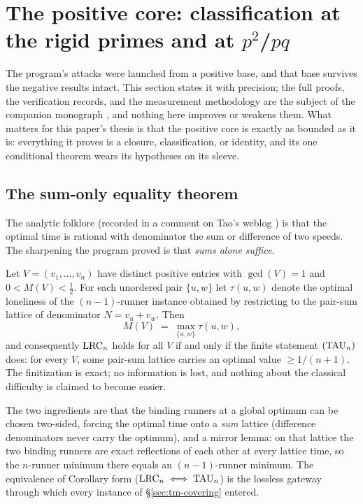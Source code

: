 
\section{The positive core: classification at the rigid primes and at
\boldmath$p^2$/$pq$}\label{sec:positive}

The program's attacks were launched from a positive base, and that base
survives the negative results intact. This section states it with
precision; the full proofs, the verification records, and the
measurement methodology are the subject of the companion monograph
\cite{prog-artifacts}, and nothing here improves or weakens them. What
matters for this paper's thesis is that the positive core is exactly as
bounded as it is: everything it proves is a closure, classification, or
identity, and its one conditional theorem wears its hypotheses on its
sleeve.

\subsection{The sum-only equality theorem}

The analytic folklore (recorded in a comment on Tao's weblog
\cite{Tao-blog}) is that the optimal time is rational with denominator
the sum or difference of two speeds. The sharpening the program proved
is that \emph{sums alone suffice}.

\begin{theorem}\label{thm:equality}
Let $V=(v_1,\dots,v_n)$ have distinct positive entries with
$\gcd(V)=1$ and $0<M(V)<\tfrac12$. For each unordered pair $\{u,w\}$
let $\tau(u,w)$ denote the optimal loneliness of the
$(n-1)$-runner instance obtained by restricting to the pair-sum lattice
of denominator $N=v_u+v_w$. Then
\[
M(V)\;=\;\max_{\{u,w\}}\tau(u,w),
\]
and consequently $\mathrm{LRC}_n$ holds for all $V$ if and only if the finite
statement $(\mathrm{TAU}_n)$ does: for every $V$, some pair-sum lattice
carries an optimal value $\ge 1/(n+1)$. The finitization is exact; no
information is lost, and nothing about the classical difficulty is
claimed to become easier.
\end{theorem}

The two ingredients are that the binding runners at a global optimum can
be chosen two-sided, forcing the optimal time onto a \emph{sum} lattice
(difference denominators never carry the optimum), and a mirror lemma:
on that lattice the two binding runners are exact reflections of each
other at every lattice time, so the $n$-runner minimum there equals an
$(n-1)$-runner minimum. The equivalence of Corollary form
($\mathrm{LRC}_n\iff\mathrm{TAU}_n$) is the lossless gateway through which every
instance of \S\ref{sec:tm-covering} entered.


